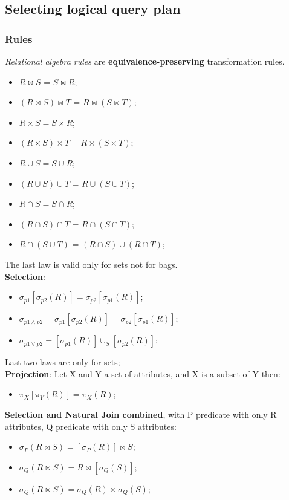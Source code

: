 \documentclass{article}
\begin{document}
\subsection{Selecting logical query plan}
\subsubsection{Rules}
\emph{Relational algebra rules} are \textbf{equivalence-preserving} transformation rules. 
\begin{itemize}
\item $R \bowtie S$ = $S \bowtie R$;
\item $(R \bowtie S) \bowtie T $ = $R \bowtie (S \bowtie T)$;
\item $R \times S = S \times R$;
\item $(R \times S) \times T = R \times (S \times T)$;
\item $R \cup S = S \cup R$;
\item $(R \cup S) \cup T $ = $R \cup (S \cup T)$;
\item $R \cap S = S \cap R$;
\item $(R \cap S) \cap T $ = $R \cap (S \cap T)$;
\item $R \cap (S \cup T) $ = $(R \cap S) \cup (R \cap T)$;
\end{itemize}
The last law is valid only for sets not for bags. \\
\textbf{Selection}:
\begin{itemize}
\item $\sigma_{p1} [ \sigma_{p2} (R)]= \sigma_{p2} [\sigma_{p1}(R)]$;
\item $\sigma_{p1  \wedge p2} = \sigma_{p1} [ \sigma_{p2} (R)]= \sigma_{p2} [\sigma_{p1}(R)]$;
\item $\sigma_{p1  \vee p2} = [ \sigma_{p1} (R)] \cup_S [ \sigma_{p2} (R)]$;
\end{itemize}
Last two laws are only for sets;\\
\textbf{Projection}:
Let X and Y a set of attributes, and X is a subset of Y then:
\begin{itemize}
\item $\pi_X[\pi_Y(R)]=\pi_X(R)$;
\end{itemize}
\textbf{Selection and Natural Join combined}, with P predicate with only R attributes, Q predicate with only S attributes:
\begin{itemize}
\item $\sigma_P (R \bowtie S) = [\sigma_P(R)] \bowtie S$;
\item $\sigma_Q (R \bowtie S) = R \bowtie [\sigma_Q(S)]$;
\item $\sigma_Q (R \bowtie S) = \sigma_Q(R) \bowtie \sigma_Q(S)$;
\end{itemize}
\end{document}
